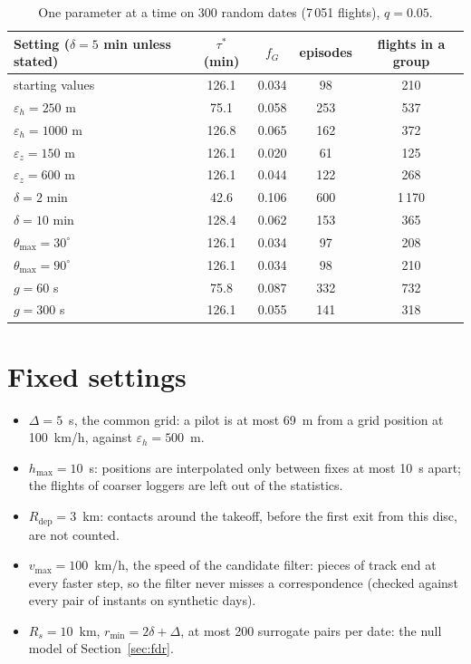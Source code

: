 \documentclass[11pt,a4paper]{article}
\begin{document}
\begin{table}[h]
\centering
\small
\begin{tabular}{@{}l c c c c@{}}
\toprule
Setting ($\delta=5$ min unless stated) & $\tau^*$ (min) & $f_G$ & episodes & flights in a group \\
\midrule
starting values & 126.1 & 0.034 & 98 & 210 \\
$\varepsilon_h=250$ m & 75.1 & 0.058 & 253 & 537 \\
$\varepsilon_h=1000$ m & 126.8 & 0.065 & 162 & 372 \\
$\varepsilon_z=150$ m & 126.1 & 0.020 & 61 & 125 \\
$\varepsilon_z=600$ m & 126.1 & 0.044 & 122 & 268 \\
$\delta=2$ min & 42.6 & 0.106 & 600 & 1\,170 \\
$\delta=10$ min & 128.4 & 0.062 & 153 & 365 \\
$\theta_{\max}=30^\circ$ & 126.1 & 0.034 & 97 & 208 \\
$\theta_{\max}=90^\circ$ & 126.1 & 0.034 & 98 & 210 \\
$g=60$ s & 75.8 & 0.087 & 332 & 732 \\
$g=300$ s & 126.1 & 0.055 & 141 & 318 \\
\bottomrule
\end{tabular}
\caption{One parameter at a time on 300 random dates (7\,051 flights), $q=0.05$.}
\label{tab:plateau}
\end{table}

\section{Fixed settings}\label{sec:fixed}

\begin{itemize}[leftmargin=1.2em]
\item $\Delta=5$~s, the common grid: a pilot is at most 69~m from a grid position at
  100~km/h, against $\varepsilon_h=500$~m.
\item $h_{\max}=10$~s: positions are interpolated only between fixes at most 10~s apart; the
  flights of coarser loggers are left out of the statistics.
\item $R_\mathrm{dep}=3$~km: contacts around the takeoff, before the first exit from this disc,
  are not counted.
\item $v_{\max}=100$~km/h, the speed of the candidate filter: pieces of track end at every
  faster step, so the filter never misses a correspondence (checked against every pair of
  instants on synthetic days).
\item $R_s=10$~km, $r_{\min}=2\delta+\Delta$, at most 200 surrogate pairs per date: the null
  model of Section~\ref{sec:fdr}.
\end{itemize}
\end{document}

